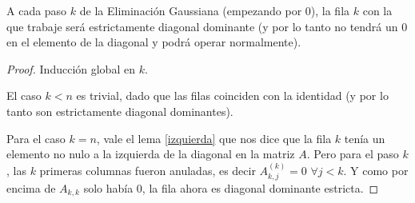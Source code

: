 \begin{proposition}\label{pivoteo}
 A cada paso $k$ de la Eliminación Gaussiana (empezando por 0), la fila $k$ con la que trabaje será estrictamente diagonal dominante (y por lo tanto no tendrá un 0 en el elemento de la diagonal y podrá operar normalmente).
\end{proposition}
\begin{proof}
 Inducción global en $k$.
 
 El caso $k < n$ es trivial, dado que las filas coinciden con la identidad (y por lo tanto son estrictamente diagonal dominantes).
 
 Para el caso $k = n$, vale el lema \ref{izquierda} que nos dice que la fila $k$ tenía un elemento no nulo a la izquierda de la diagonal en la matriz $A$. Pero para el paso $k$, las $k$ primeras columnas fueron anuladas, es decir $A_{k,j}^{(k)}=0$ $\forall j < k$. Y como por encima de $A_{k,k}$ solo había 0, la fila ahora es diagonal dominante estricta.
 
\end{proof}
